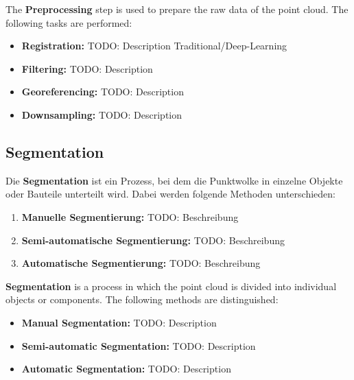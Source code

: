 \begin{English}
    The \textbf{Preprocessing} step is used to prepare the raw data of the point cloud. The following tasks are performed:

    \begin{itemize}
        \item \textbf{Registration:} TODO: Description Traditional/Deep-Learning
        \item \textbf{Filtering:} TODO: Description
        \item \textbf{Georeferencing:} TODO: Description
        \item \textbf{Downsampling:} TODO: Description
    \end{itemize}
\end{English}

\subsection{Segmentation}
\begin{German}
    Die \textbf{Segmentation} ist ein Prozess, bei dem die Punktwolke in einzelne Objekte oder Bauteile unterteilt wird. Dabei werden folgende Methoden unterschieden:

    \begin{enumerate}
        \item \textbf{Manuelle Segmentierung:} TODO: Beschreibung
        \item \textbf{Semi-automatische Segmentierung:} TODO: Beschreibung
        \item \textbf{Automatische Segmentierung:} TODO: Beschreibung
    \end{enumerate}
\end{German}

\begin{English}
    \textbf{Segmentation} is a process in which the point cloud is divided into individual objects or components. The following methods are distinguished:

    \begin{itemize}
        \item \textbf{Manual Segmentation:} TODO: Description
        \item \textbf{Semi-automatic Segmentation:} TODO: Description
        \item \textbf{Automatic Segmentation:} TODO: Description
    \end{itemize}
\end{English}

